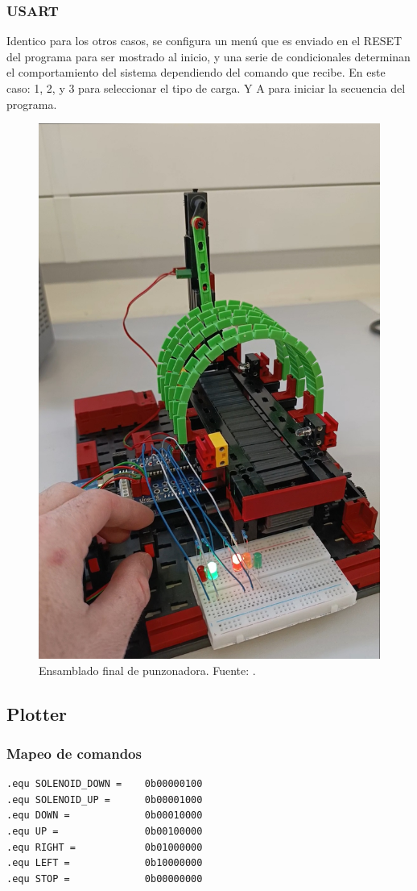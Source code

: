 \subsubsection{USART}
Identico para los otros casos, se configura un menú que es enviado en el RESET del programa para ser mostrado al inicio, y una serie de condicionales determinan el comportamiento del sistema dependiendo del comando que recibe. En este caso: 1, 2, y 3 para seleccionar el tipo de carga. Y A para iniciar la secuencia del programa.


\begin{figure}[H]
  \centering
  \includegraphics[width=0.7\linewidth]{./Anexos/Resultados/Punzonadora/Circuito.jpg}
  \caption{Ensamblado final de punzonadora. Fuente: \cite{LabDrive}.}
  \label{fig:punzonadora_circuito}
\end{figure}


\subsection{Plotter}

\subsubsection{Mapeo de comandos}
\begin{verbatim}
.equ SOLENOID_DOWN =	0b00000100
.equ SOLENOID_UP =		0b00001000
.equ DOWN =				0b00010000
.equ UP =				0b00100000
.equ RIGHT =			0b01000000
.equ LEFT =				0b10000000
.equ STOP =				0b00000000
\end{verbatim}
